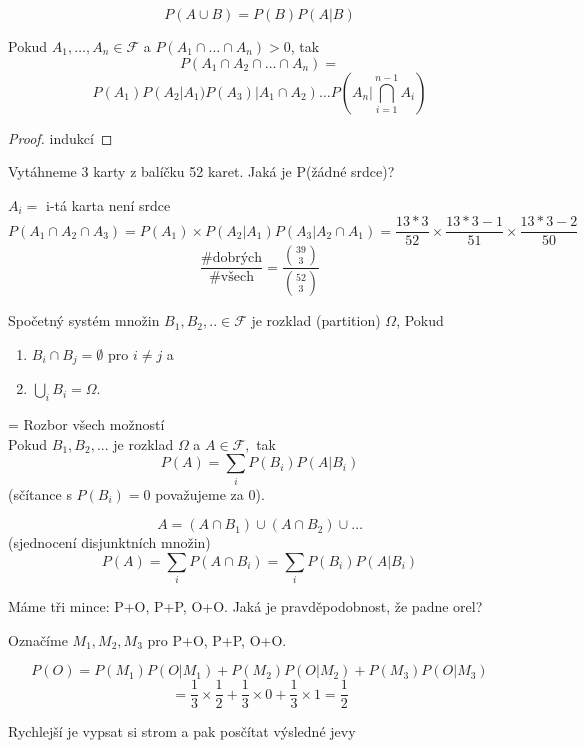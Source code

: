 \documentclass[../main.tex]{subfiles}
\begin{document}
\begin{definition}
    \[P(A\cup B) = P(B)P(A|B)\]
\end{definition}

\begin{theorem}
    Pokud $A_1,\dots,A_n \in \mathcal{F}$ a $P(A_1\cap \dots \cap A_n) > 0$, tak
    \[P(A_1\cap A_2 \cap \dots \cap A_n) = \]
    \[P(A_1)P(A_2|A_1)P(A_3)|A_1\cap A_2) \dots P(A_n | \bigcap^{n-1}_{i=1} A_i)\]
\end{theorem}
\begin{proof}
    indukcí %
\end{proof}


\begin{example}
    Vytáhneme 3 karty z balíčku 52 karet. Jaká je P(žádné srdce)?

    $A_i =$ i-tá karta není srdce
    \[P(A_1\cap A_2 \cap A_3) = P(A_1) \times P(A_2 | A_1) P(A_3 | A_2\cap A_1) = \frac{13*3}{52} \times \frac{13*3 -1}{51} \times \frac{13*3 - 2}{50}\]
    \[\frac{\text{\#dobrých}}{\text{\#všech}} = \frac{\binom{39}{3}}{\binom{52}{3}}\]
\end{example}

\begin{definition}
    Spočetný systém množin $B_1,B_2,..\in \mathcal{F}$ je rozklad (partition) $\Omega$, Pokud
    \begin{enumerate}
        \item $B_i \cap B_j = \emptyset$ pro $i \neq j$ a
        \item $\bigcup_i B_i = \Omega$.
    \end{enumerate}
\end{definition}

\begin{theorem}
    = Rozbor všech možností
    \\ Pokud $B_1,B_2,...$ je rozklad $\Omega$ a $A \in \mathcal{F},$ tak
    \[P(A) = \sum_i P(B_i)P(A|B_i)\]
    (sčítance s $P(B_i) = 0$ považujeme za $0$).

    \[A = (A\cap B_1) \cup (A\cap B_2) \cup \dots\]
    (sjednocení disjunktních množin)
    \[P(A) = \sum_i P(A\cap B_i) = \sum_i P(B_i)P(A|B_i)\]
\end{theorem}

\begin{example}
    Máme tři mince: P+O, P+P, O+O. Jaká je pravděpodobnost, že padne orel?

    \noindent
    Označíme $M_1, M_2, M_3$ pro P+O, P+P, O+O.
    
    \[P(O) = P(M_1)P(O|M_1) + P(M_2)P(O|M_2) + P(M_3)P(O|M_3)\]
    \[ = \frac{1}{3}\times \frac{1}{2} + \frac{1}{3}\times 0 + \frac{1}{3}\times 1 = \frac{1}{2}\]

    \noindent
    Rychlejší je vypsat si strom a pak posčítat výsledné jevy
\end{example}
\end{document}

